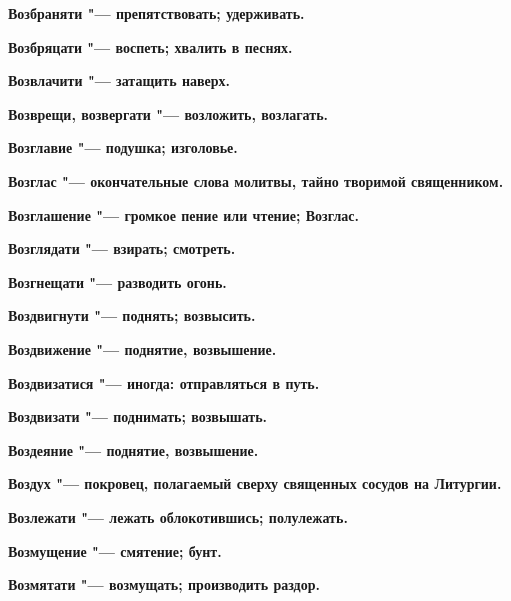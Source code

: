 \bfseries Возбраняти \normalfont{} "--- препятствовать; удерживать. 




\bfseries Возбряцати \normalfont{} "--- воспеть; хвалить в песнях. 




\bfseries Возвлачити \normalfont{} "--- затащить наверх. 




\bfseries Возврещи, возвергати \normalfont{} "--- возложить, возлагать. 




\bfseries Возглавие \normalfont{} "--- подушка; изголовье. 




\bfseries Возглас \normalfont{} "--- окончательные слова молитвы, тайно творимой священником. 




\bfseries Возглашение \normalfont{} "--- громкое пение или чтение; Возглас. 




\bfseries Возглядати \normalfont{} "--- взирать; смотреть. 




\bfseries Возгнещати \normalfont{} "--- разводить огонь. 




\bfseries Воздвигнути \normalfont{} "--- поднять; возвысить. 




\bfseries Воздвижение \normalfont{} "--- поднятие, возвышение. 




\bfseries Воздвизатися \normalfont{} "--- иногда: отправляться в путь. 




\bfseries Воздвизати \normalfont{} "--- поднимать; возвышать. 




\bfseries Воздеяние \normalfont{} "--- поднятие, возвышение. 




\bfseries Воздух \normalfont{} "--- покровец, полагаемый сверху священных сосудов на Литургии. 




\bfseries Возлежати \normalfont{} "--- лежать облокотившись; полулежать. 




\bfseries Возмущение \normalfont{} "--- смятение; бунт. 




\bfseries Возмятати \normalfont{} "--- возмущать; производить раздор. 




